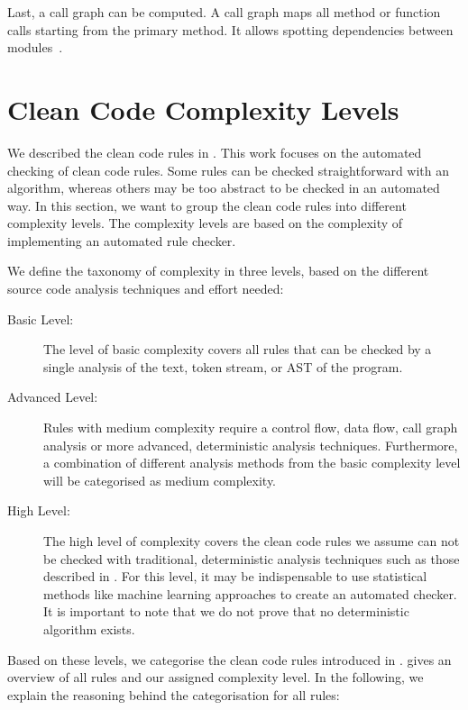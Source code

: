 Last, a call graph can be computed. A call graph maps all method or function calls starting from the primary method. It allows spotting dependencies between modules~\cite{prahofer_static_2017}.

\section{Clean Code Complexity Levels}\label{sec:cc_complexity_levels}
We described the clean code rules in . This work focuses on the automated checking of clean code rules. Some rules can be checked straightforward with an algorithm, whereas others may be too abstract to be checked in an automated way. In this section, we want to group the clean code rules into different complexity levels. The complexity levels are based on the complexity of implementing an automated rule checker. 

We define the taxonomy of complexity in three levels, based on the different source code analysis techniques and effort needed:
\begin{description}
    \item[Basic Level:] The level of basic complexity covers all rules that can be checked by a single analysis of the text, token stream, or AST of the program.
    \item[Advanced Level:] Rules with medium complexity require a control flow, data flow, call graph analysis or more advanced, deterministic analysis techniques. Furthermore, a combination of different analysis methods from the basic complexity level will be categorised as medium complexity. 
    \item[High Level:] The high level of complexity covers the clean code rules we assume can not be checked with traditional, deterministic analysis techniques such as those described in . For this level, it may be indispensable to use statistical methods like machine learning approaches to create an automated checker. It is important to note that we do not prove that no deterministic algorithm exists. 
\end{description}

Based on these levels, we categorise the clean code rules introduced in .  gives an overview of all rules and our assigned complexity level. In the following, we explain the reasoning behind the categorisation for all rules:


